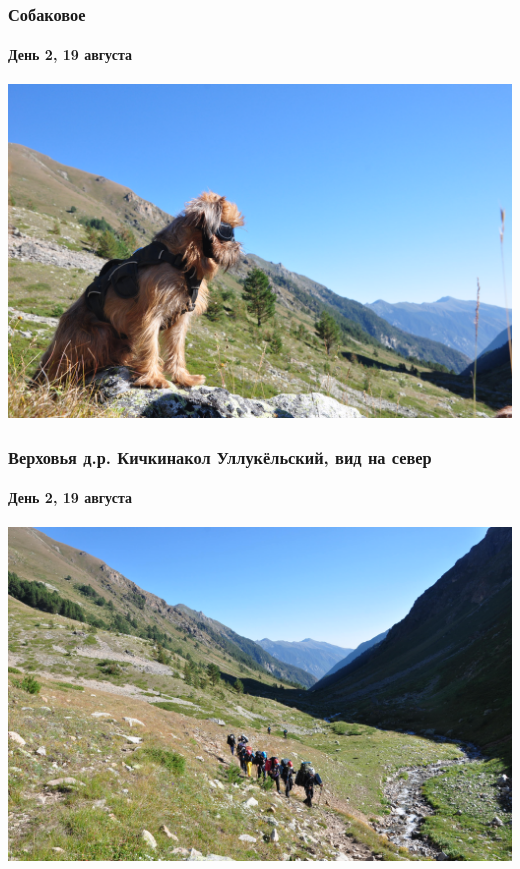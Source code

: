 \begin{frame}
	\frametitle{Собаковое}
	\framesubtitle{День 2, 19 августа}
	\centering
	\includegraphics[width=\linewidth]{../pics/DSC_0687}
	\end{frame}

\begin{frame}
	\frametitle{Верховья д.р. Кичкинакол Уллукёльский, вид на север}
	\framesubtitle{День 2, 19 августа}
	\centering
	\includegraphics[width=\linewidth]{../pics/DSC_0696}
	\end{frame}

